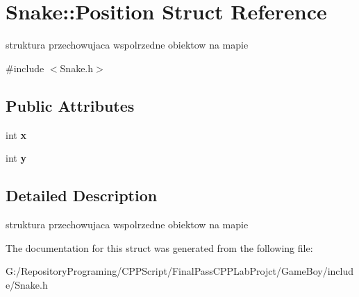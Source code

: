 \hypertarget{struct_snake_1_1_position}{}\section{Snake\+::Position Struct Reference}
\label{struct_snake_1_1_position}


struktura przechowujaca wspolrzedne obiektow na mapie  




{\ttfamily \#include $<$Snake.\+h$>$}

\subsection*{Public Attributes}
\begin{DoxyCompactItemize}
\item 
\mbox{\label{struct_snake_1_1_position_adb7a36e84b903f294e8855861d7420fb}} 
int {\bfseries x}
\item 
\mbox{\label{struct_snake_1_1_position_a4529e0e97eed0f79307877058fbf9f57}} 
int {\bfseries y}
\end{DoxyCompactItemize}


\subsection{Detailed Description}
struktura przechowujaca wspolrzedne obiektow na mapie 

The documentation for this struct was generated from the following file\+:\begin{DoxyCompactItemize}
\item 
G\+:/\+Repository\+Programing/\+C\+P\+P\+Script/\+Final\+Pass\+C\+P\+P\+Lab\+Projct/\+Game\+Boy/include/Snake.\+h\end{DoxyCompactItemize}
